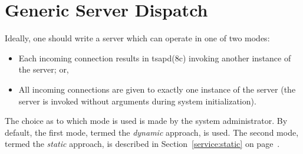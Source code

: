 \section	{Generic Server Dispatch}\label{acs:server}
Ideally,
one should write a server which can operate in one of two modes:
\begin{itemize}
\item	Each incoming connection results in \man tsapd(8c) invoking another
	instance of the server; or,

\item	All incoming connections are given to exactly one instance of the
	server (the server is invoked without arguments during system
	initialization).
\end{itemize}
The choice as to which mode is used is made by the system administrator.
By default,
the first mode, termed the {\em dynamic\/} approach, is used.
The second mode, termed the {\em static\/} approach,
is described in Section~\ref{service:static} on
page~\pageref{service:static}.

